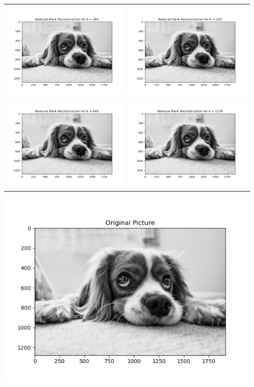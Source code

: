 \documentclass{article}
\begin{document}
\begin{enumerate}
\begin{center}
    \begin{tabular}{| c | c |}
    \hline \\
    \includegraphics[width=.40\textwidth]{Image_appn_100160.png} & \includegraphics[width=.40\textwidth]{Image_appn_100320.png} \\
    \includegraphics[width=.40\textwidth]{Image_appn_100640.png} & \includegraphics[width=.40\textwidth]{Image_appn_101279.png} \\
    \hline
    \end{tabular}

    \includegraphics[width=.60\textwidth]{original.png}
\end{center}


\end{enumerate}
\end{document}
